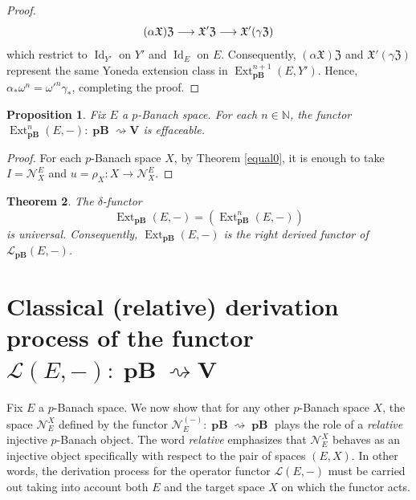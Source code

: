 \documentclass[12pt,a4paper]{amsproc}
\newtheorem{thm}{Theorem}[section]
\newtheorem{prop}[thm]{Proposition}
\theoremstyle{remark}
\theoremstyle{definition}
\newcommand{\Ext}{\operatorname{Ext}}
\newcommand{\pBan}{\operatorname{\textbf{pB}}}
\newcommand{\V}{\operatorname{V}}
\newcommand{\Id}{\operatorname{Id}}
\numberwithin{equation}{section}
\begin{document}
\begin{proof}
\begin{equation}\notag
	(\alpha\mathfrak{X}) \mathfrak{Z} \longrightarrow \mathfrak{X}' \mathfrak{Z} \longrightarrow \mathfrak{X}' (\gamma\mathfrak{Z})
\end{equation}
which restrict to $\Id_{Y'}$ on $Y'$ and $\Id_E$ on $E$. Consequently, $(\alpha\mathfrak{X}) \mathfrak{Z}$ and $\mathfrak{X}' (\gamma\mathfrak{Z})$ represent the same Yoneda extension class in $\Ext^{n+1}_{\boldsymbol{\pBan}}(E,Y')$. Hence, $\alpha_* \omega^n = \omega'^n \gamma_*$, completing the proof.
\end{proof}

\begin{prop}\label{th:eff}
	Fix $E$ a $p$-Banach space. For each $n \in \mathbb N$, the functor $\Ext^n_{\pBan}(E,-): \pBan \rightsquigarrow \textbf{V}$ is effaceable.
\end{prop}

\begin{proof}
	For each $p$-Banach space $X$, by Theorem \ref{equal0}, it is enough to take $I=\mathcal{N}_X^E$ and $u=\rho_X:X \to \mathcal{N}_X^E$.
\end{proof}



\begin{thm}\label{th:der_universal}
	The $\delta$-functor 
    $$\Ext_{\pBan}(E,-)=(\Ext^n_{\pBan}(E,-))$$ 
    is universal. Consequently, $\Ext_{\pBan}(E,-)$ is the right derived functor of $\mathcal L_{\pBan}(E,-)$.
\end{thm}


\section{Classical (relative) derivation process of the functor $\mathcal{L}(E,-): \boldsymbol{\pBan} \rightsquigarrow \mathbf{V}$} \label{derived}

Fix $E$ a $p$-Banach space. We now show that for any other $p$-Banach space $X$, the space $\mathcal{N}_E^X$ defined by the functor $\mathcal{N}_E^{(-)}: \boldsymbol{\pBan} \rightsquigarrow \boldsymbol{\pBan}$ plays the role of a \emph{relative} injective $p$-Banach object. The word \emph{relative} emphasizes that $\mathcal{N}_E^X$ behaves as an injective object specifically with respect to the pair of spaces $(E,X)$. In other words, the derivation process for the operator functor $\mathcal{L}(E,-)$ must be carried out taking into account both $E$ and the target space $X$ on which the functor acts.
\end{document}
